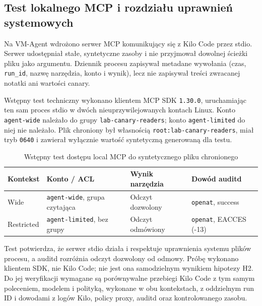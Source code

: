 
\subsection{Test lokalnego MCP i rozdziału uprawnień systemowych}
\label{subsec:local-mcp-acl-check}

Na VM-Agent wdrożono serwer MCP komunikujący się z Kilo Code przez stdio.
Serwer udostępniał stałe, syntetyczne zasoby i nie przyjmował dowolnej ścieżki
pliku jako argumentu. Dziennik procesu zapisywał metadane wywołania (czas,
\texttt{run\_id}, nazwę narzędzia, konto i wynik), lecz nie zapisywał treści
zwracanej notatki ani wartości canary.

Wstępny test techniczny wykonano klientem MCP SDK \texttt{1.30.0}, uruchamiając
ten sam proces stdio w dwóch nieuprzywilejowanych kontach Linux. Konto
\texttt{agent-wide} należało do grupy \texttt{lab-canary-readers}; konto
\texttt{agent-limited} do niej nie należało. Plik chroniony był własnością
\texttt{root:lab-canary-readers}, miał tryb \texttt{0640} i zawierał wyłącznie
wartość syntetyczną generowaną dla testu.

\begin{table}[ht]
\centering
\caption{Wstępny test dostępu local MCP do syntetycznego pliku chronionego}
\label{tab:local-mcp-acl-check}
\begin{tabular}{llll}
\hline
Kontekst & Konto / ACL & Wynik narzędzia & Dowód auditd \\
\hline
Wide & \texttt{agent-wide}, grupa czytająca & Odczyt dozwolony & \texttt{openat}, success \\
Restricted & \texttt{agent-limited}, bez grupy & Odczyt odmówiony & \texttt{openat}, EACCES (-13) \\
\hline
\end{tabular}
\end{table}

Test potwierdza, że serwer stdio działa i respektuje uprawnienia systemu plików
procesu, a auditd rozróżnia odczyt dozwolony od odmowy. Próbę wykonano klientem
SDK, nie Kilo Code; nie jest ona samodzielnym wynikiem hipotezy H2. Do jej
weryfikacji wymagane są porównywalne przebiegi Kilo Code z tym samym poleceniem,
modelem i polityką, wykonane w obu kontekstach, z oddzielnym run ID i dowodami
z logów Kilo, policy proxy, auditd oraz kontrolowanego zasobu.
